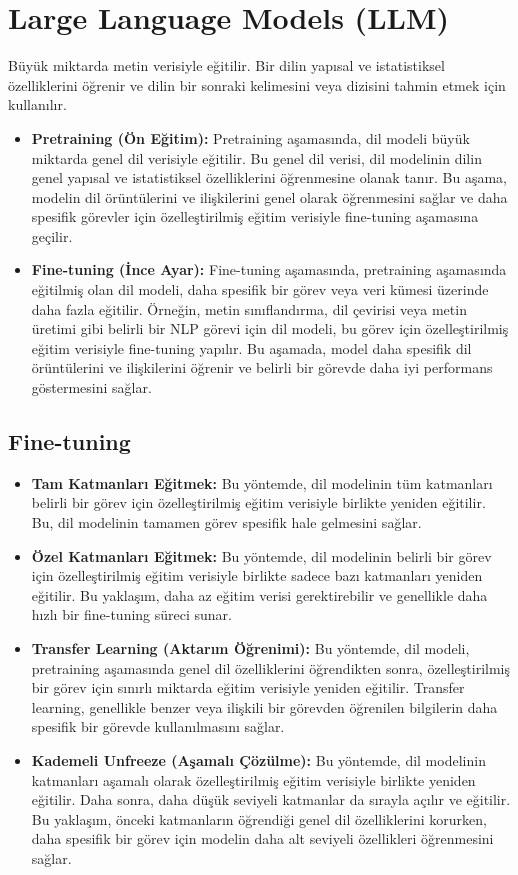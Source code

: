 \section{Large Language Models (LLM)}
Büyük miktarda metin verisiyle eğitilir. Bir dilin yapısal ve istatistiksel özelliklerini öğrenir ve dilin bir sonraki kelimesini veya dizisini tahmin etmek için kullanılır.

\begin{itemize}
    \item \textbf{Pretraining (Ön Eğitim):} Pretraining aşamasında, dil modeli büyük miktarda genel dil verisiyle eğitilir. Bu genel dil verisi, dil modelinin dilin genel yapısal ve istatistiksel özelliklerini öğrenmesine olanak tanır. Bu aşama, modelin dil örüntülerini ve ilişkilerini genel olarak öğrenmesini sağlar ve daha spesifik görevler için özelleştirilmiş eğitim verisiyle fine-tuning aşamasına geçilir.
    \item \textbf{Fine-tuning (İnce Ayar):} Fine-tuning aşamasında, pretraining aşamasında eğitilmiş olan dil modeli, daha spesifik bir görev veya veri kümesi üzerinde daha fazla eğitilir. Örneğin, metin sınıflandırma, dil çevirisi veya metin üretimi gibi belirli bir NLP görevi için dil modeli, bu görev için özelleştirilmiş eğitim verisiyle fine-tuning yapılır. Bu aşamada, model daha spesifik dil örüntülerini ve ilişkilerini öğrenir ve belirli bir görevde daha iyi performans göstermesini sağlar.
\end{itemize}

\subsection{Fine-tuning}
\begin{itemize}
    \item \textbf{Tam Katmanları Eğitmek:} Bu yöntemde, dil modelinin tüm katmanları belirli bir görev için özelleştirilmiş eğitim verisiyle birlikte yeniden eğitilir. Bu, dil modelinin tamamen görev spesifik hale gelmesini sağlar.
    \item \textbf{Özel Katmanları Eğitmek:} Bu yöntemde, dil modelinin belirli bir görev için özelleştirilmiş eğitim verisiyle birlikte sadece bazı katmanları yeniden eğitilir. Bu yaklaşım, daha az eğitim verisi gerektirebilir ve genellikle daha hızlı bir fine-tuning süreci sunar.
    \item \textbf{Transfer Learning (Aktarım Öğrenimi):} Bu yöntemde, dil modeli, pretraining aşamasında genel dil özelliklerini öğrendikten sonra, özelleştirilmiş bir görev için sınırlı miktarda eğitim verisiyle yeniden eğitilir. Transfer learning, genellikle benzer veya ilişkili bir görevden öğrenilen bilgilerin daha spesifik bir görevde kullanılmasını sağlar.
    \item \textbf{Kademeli Unfreeze (Aşamalı Çözülme):} Bu yöntemde, dil modelinin katmanları aşamalı olarak özelleştirilmiş eğitim verisiyle birlikte yeniden eğitilir. Daha sonra, daha düşük seviyeli katmanlar da sırayla açılır ve eğitilir. Bu yaklaşım, önceki katmanların öğrendiği genel dil özelliklerini korurken, daha spesifik bir görev için modelin daha alt seviyeli özellikleri öğrenmesini sağlar.
\end{itemize}

